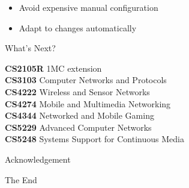 \begin{cf}{\small
	\begin{itemize}
	\item Avoid expensive manual configuration
	\item Adapt to changes automatically
	\end{itemize}
}
\end{cf}

\begin{cf}
What's Next?
\end{cf}

\begin{frame}\small
\textbf{CS2105R} 1MC extension\\
\textbf{CS3103} Computer Networks and Protocols\\
\textbf{CS4222} Wireless and Sensor Networks\\
\textbf{CS4274} Mobile and Multimedia Networking\\
\textbf{CS4344} Networked and Mobile Gaming\\
\textbf{CS5229} Advanced Computer Networks\\
\textbf{CS5248} Systems Support for Continuous Media
\end{frame}

\begin{cf}
Acknowledgement
\end{cf}

\begin{cf}
The End
\end{cf}

